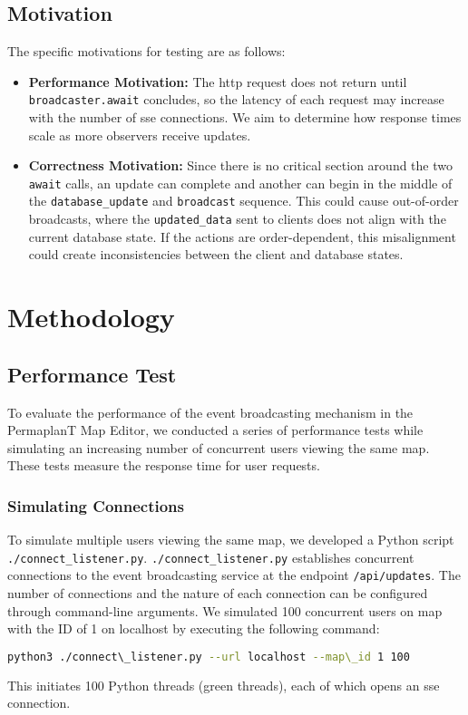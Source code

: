 \documentclass[final,draft,oneside]{vutinfth}
\begin{document}
\section{Motivation}

The specific motivations for testing are as follows:
\begin{itemize}
    \item \textbf{Performance Motivation:} The \gls{http} request does not return until \texttt{broadcaster.await} concludes, so the latency of each request may increase with the number of \gls{sse} connections.
    We aim to determine how response times scale as more observers receive updates.
    \item \textbf{Correctness Motivation:} Since there is no critical section around the two \texttt{await} calls, an update can complete and another can begin in the middle of the \texttt{database\_update} and \texttt{broadcast} sequence.
    This could cause out-of-order broadcasts, where the \texttt{updated\_data} sent to clients does not align with the current database state.
    If the actions are order-dependent, this misalignment could create inconsistencies between the client and database states.
\end{itemize}

\chapter{Methodology}

\section{Performance Test}

To evaluate the performance of the event broadcasting mechanism in the PermaplanT Map Editor, we conducted a series of performance tests while simulating an increasing number of concurrent users viewing the same map.
These tests measure the response time for user requests.

\subsection{Simulating Connections}
To simulate multiple users viewing the same map, we developed a Python script \texttt{./connect\_listener.py}.
\texttt{./connect\_listener.py} establishes concurrent connections to the event broadcasting service at the endpoint \texttt{/api/updates}.
The number of connections and the nature of each connection can be configured through command-line arguments.
We simulated 100 concurrent users on map with the ID of 1 on localhost by executing the following command: 
\begin{lstlisting}[language=sh]
python3 ./connect\_listener.py --url localhost --map\_id 1 100
\end{lstlisting}
This initiates 100 Python threads (green threads), each of which opens an \gls{sse} connection.  
\end{document}

